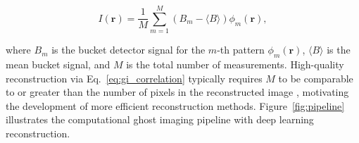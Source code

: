 \begin{equation}
    I(\mathbf{r}) = \frac{1}{M} \sum_{m=1}^{M} \left( B_m - \langle B \rangle \right) \phi_m(\mathbf{r}),
    \label{eq:gi_correlation}
\end{equation}

\noindent where $B_m$ is the bucket detector signal for the $m$-th pattern $\phi_m(\mathbf{r})$, $\langle B \rangle$ is the mean bucket signal, and $M$ is the total number of measurements. High-quality reconstruction via Eq.~\eqref{eq:gi_correlation} typically requires $M$ to be comparable to or greater than the number of pixels in the reconstructed image \citep{erkmen2010}, motivating the development of more efficient reconstruction methods. Figure~\ref{fig:pipeline} illustrates the computational ghost imaging pipeline with deep learning reconstruction.

